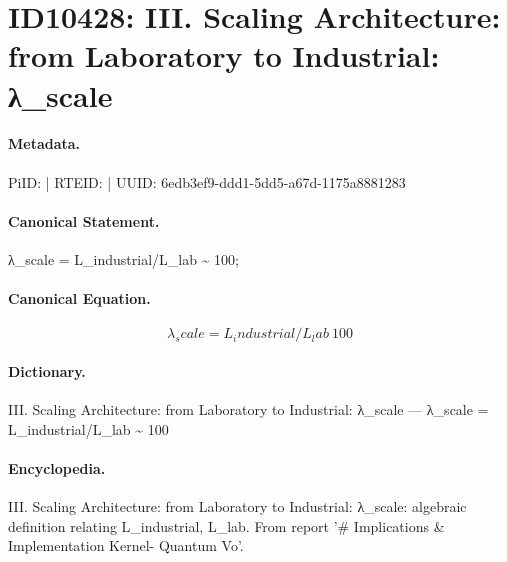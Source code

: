 \section*{ID10428: III. Scaling Architecture: from Laboratory to Industrial: λ\_scale}
\paragraph{Metadata.}
PiID:  | RTEID:  | UUID: 6edb3ef9-ddd1-5dd5-a67d-1175a8881283

\paragraph{Canonical Statement.}
λ\_scale = L\_industrial/L\_lab \textasciitilde{} 100;

\paragraph{Canonical Equation.}
\[
λ_scale = L_industrial/L_lab ~ 100
\]

\paragraph{Dictionary.}
III. Scaling Architecture: from Laboratory to Industrial: λ\_scale — λ\_scale = L\_industrial/L\_lab \textasciitilde{} 100

\paragraph{Encyclopedia.}
III. Scaling Architecture: from Laboratory to Industrial: λ\_scale: algebraic definition relating L\_industrial, L\_lab. From report '\# Implications \& Implementation Kernel- Quantum Vo'.
